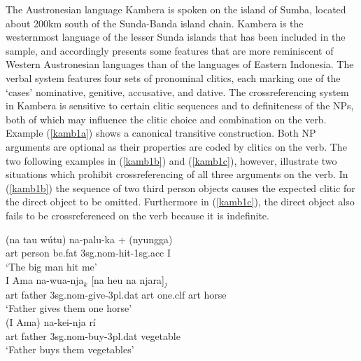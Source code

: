 The Austronesian language Kambera is spoken on the island of Sumba, located about 200km south of the Sunda-Banda island chain. Kambera is the westernmost language of the lesser Sunda islands that has been included in the sample, and accordingly presents some features that are more reminiscent of Western Austronesian languages than of the languages of Eastern Indonesia. The verbal system features four sets of pronominal clitics, each marking one of the `cases' nominative, genitive, accusative, and dative. The crossreferencing system in Kambera is sensitive to certain clitic sequences and to definiteness of the NPs, both of which may influence the clitic choice and combination on the verb. Example (\ref{kamb1a}) shows a canonical transitive construction. Both NP arguments are optional as their properties are coded by clitics on the verb. The two following examples in (\ref{kamb1b}) and (\ref{kamb1c}), however, illustrate two situations which prohibit crossreferencing of all three arguments on the verb. In (\ref{kamb1b}) the sequence of two third person objects causes the expected clitic for the direct object to be omitted. Furthermore in (\ref{kamb1c}), the direct object also fails to be crossreferenced on the verb because it is indefinite.

\pex 
\a \label{kamb1a}
\gll (na tau wútu) na-palu-ka + (nyungga) \\
\acs{art} person be.fat \acs{3}\acs{sg}.\acs{nom}-hit-\acs{1}\acs{sg}.\acs{acc} I \\
\glft `The big man hit me' \\ 
\z
\a \label{kamb1b}
\gla I Ama na-wua-nja$_k$ [na heu na njara]$_j$ \\
\acs{art} father \acs{3}\acs{sg}.\acs{nom}-give-\acs{3}\acs{pl}.\acs{dat} \acs{art} one.\acs{clf} \acs{art} horse \\
\glft `Father gives them one horse' \\ 
\z
\a \label{kamb1c}
\gla (I Ama) na-kei-nja rí \\ 
\acs{art} father \acs{3}\acs{sg}.\acs{nom}-buy-\acs{3}\acs{pl}.\acs{dat} vegetable \\
\glft `Father buys them vegetables' \\ 
\z
\xe

